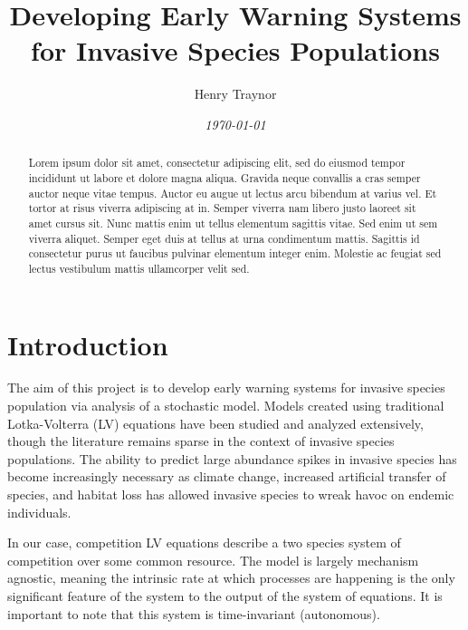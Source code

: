 \documentclass[twocolumn,prb,amsmath,amssymb,amsfonts,nobalancelastpage]{revtex4}
\begin{document}
\title{Developing Early Warning Systems for Invasive Species Populations}

\author{Henry Traynor}

\date{\textit{\today}}

\begin{abstract}

Lorem ipsum dolor sit amet, consectetur adipiscing elit, sed do eiusmod tempor incididunt ut labore et dolore magna aliqua. Gravida neque convallis a cras semper auctor neque vitae tempus. Auctor eu augue ut lectus arcu bibendum at varius vel. Et tortor at risus viverra adipiscing at in. Semper viverra nam libero justo laoreet sit amet cursus sit. Nunc mattis enim ut tellus elementum sagittis vitae. Sed enim ut sem viverra aliquet. Semper eget duis at tellus at urna condimentum mattis. Sagittis id consectetur purus ut faucibus pulvinar elementum integer enim. Molestie ac feugiat sed lectus vestibulum mattis ullamcorper velit sed.

\end{abstract}
\maketitle
\section{Introduction}

The aim of this project is to develop early warning systems for invasive species population via analysis of a stochastic model. Models created using traditional Lotka-Volterra (LV) equations have been studied and analyzed extensively, though the literature remains sparse in the context of invasive species populations. The ability to predict large abundance spikes in invasive species has become increasingly necessary as climate change, increased artificial transfer of species, and habitat loss has allowed invasive species to wreak havoc on endemic individuals.

In our case, competition LV equations describe a two species system of competition over some common resource. The model is largely mechanism agnostic, meaning the intrinsic rate at which processes are happening is the only significant feature of the system to the output of the system of equations. It is important to note that this system is time-invariant (autonomous). 
\end{document}
